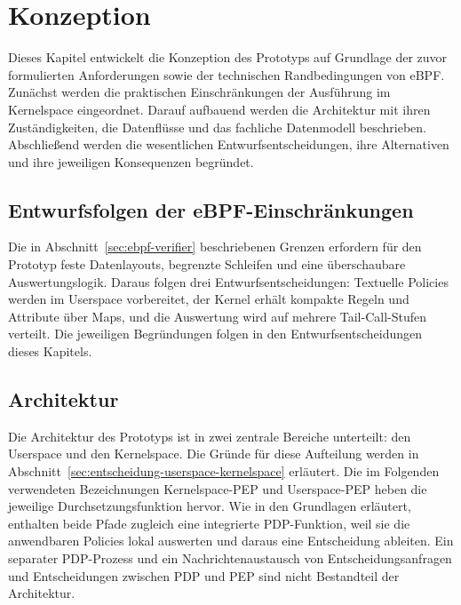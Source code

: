 \section{Konzeption}

Dieses Kapitel entwickelt die Konzeption des Prototyps auf Grundlage der zuvor formulierten Anforderungen sowie der technischen Randbedingungen von eBPF.
Zunächst werden die praktischen Einschränkungen der Ausführung im Kernelspace eingeordnet.
Darauf aufbauend werden die Architektur mit ihren Zuständigkeiten, die Datenflüsse und das fachliche Datenmodell beschrieben.
Abschließend werden die wesentlichen Entwurfsentscheidungen, ihre Alternativen und ihre jeweiligen Konsequenzen begründet.



\subsection{Entwurfsfolgen der eBPF-Einschränkungen}
Die in Abschnitt~\ref{sec:ebpf-verifier} beschriebenen Grenzen erfordern für den Prototyp feste Datenlayouts, begrenzte Schleifen und eine überschaubare Auswertungslogik. Daraus folgen drei Entwurfsentscheidungen: Textuelle Policies werden im Userspace vorbereitet, der Kernel erhält kompakte Regeln und Attribute über Maps, und die Auswertung wird auf mehrere Tail-Call-Stufen verteilt. Die jeweiligen Begründungen folgen in den Entwurfsentscheidungen dieses Kapitels.

\subsection{Architektur}

Die Architektur des Prototyps ist in zwei zentrale Bereiche unterteilt: den Userspace und den Kernelspace. 
Die Gründe für diese Aufteilung werden in Abschnitt~\ref{sec:entscheidung-userspace-kernelspace} erläutert.
Die im Folgenden verwendeten Bezeichnungen Kernelspace-PEP und Userspace-PEP heben die jeweilige Durchsetzungsfunktion hervor.
Wie in den Grundlagen erläutert, enthalten beide Pfade zugleich eine integrierte PDP-Funktion, weil sie die anwendbaren Policies lokal auswerten und daraus eine Entscheidung ableiten.
Ein separater PDP-Prozess und ein Nachrichtenaustausch von Entscheidungsanfragen und Entscheidungen zwischen PDP und PEP sind nicht Bestandteil der Architektur.

